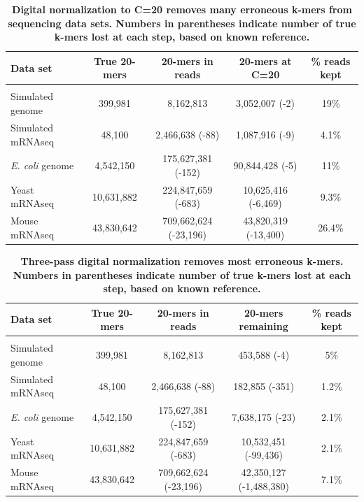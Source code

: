 \documentclass[10pt]{article}
\begin{document}
\begin{table}[!ht]
\caption{
\bf{Digital normalization to C=20 removes many erroneous k-mers from sequencing data sets.  Numbers
in parentheses indicate number of true k-mers lost at each step, based on known reference.}}
\begin{tabular}{|l|c|c|c|c|}
Data set & True 20-mers & 20-mers in reads & 20-mers at C=20 & \% reads kept\\
\hline \\
Simulated genome & 399,981 & 8,162,813 & 3,052,007 (-2) & 19\% \\
Simulated mRNAseq & 48,100 & 2,466,638 (-88) & 1,087,916 (-9) & 4.1\% \\
{\em E. coli} genome & 4,542,150 & 175,627,381 (-152) & 90,844,428 (-5) & 11\% \\
Yeast mRNAseq & 10,631,882 & 224,847,659 (-683) & 10,625,416 (-6,469) & 9.3\% \\
Mouse mRNAseq & 43,830,642 & 709,662,624 (-23,196) & 43,820,319 (-13,400) & 26.4\% \\
\end{tabular}
\begin{flushleft}
\end{flushleft}
\label{tab:normC20}
\end{table}



\begin{table}[!ht]
\caption{
\bf{Three-pass digital normalization removes most erroneous k-mers.  Numbers
in parentheses indicate number of true k-mers lost at each step, based on known reference.}}
\begin{tabular}{|l|c|c|c|c|}
Data set & True 20-mers & 20-mers in reads & 20-mers remaining & \% reads kept\\
\hline \\
Simulated genome & 399,981 & 8,162,813 & 453,588 (-4) & 5\% \\
Simulated mRNAseq & 48,100 & 2,466,638 (-88) & 182,855 (-351) & 1.2\% \\
{\em E. coli} genome & 4,542,150 & 175,627,381 (-152) & 7,638,175 (-23) & 2.1\% \\
Yeast mRNAseq & 10,631,882 & 224,847,659 (-683) & 10,532,451 (-99,436) & 2.1\% \\
Mouse mRNAseq & 43,830,642 & 709,662,624 (-23,196) & 42,350,127 (-1,488,380) & 7.1\% \\
\end{tabular}
\begin{flushleft}
\end{flushleft}
\label{tab:normC5}
\end{table}
\end{document}
